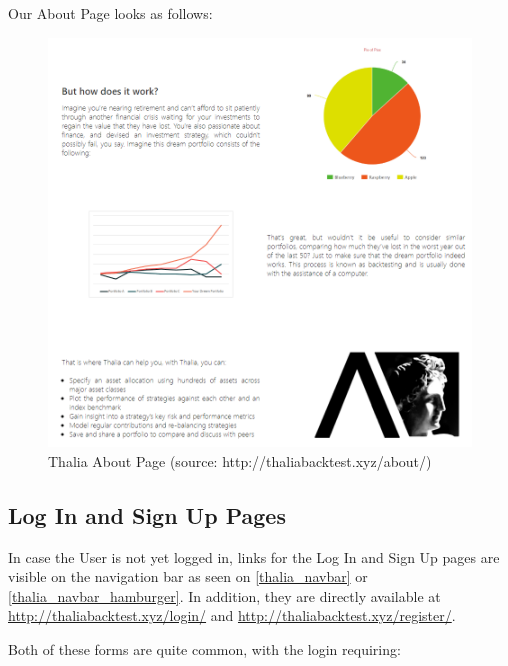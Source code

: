 \documentclass[main.tex]{subfiles}
\begin{document}
Our About Page looks as follows:



\begin{figure}[H]

   \centering

   \includegraphics[width=\textwidth]{08Appendices/081User/081Pictures/about.png}

   \caption{Thalia About Page (source: http://thaliabacktest.xyz/about/)}

   \label{thalia_about}

\end{figure}



\subsection{Log In and Sign Up Pages}

In case the User is not yet logged in, links for the Log In and Sign Up pages are visible on the navigation bar as seen on \figurename{\ref{thalia_navbar}} or \figurename{\ref{thalia_navbar_hamburger}}. In addition, they are directly available at \url{http://thaliabacktest.xyz/login/} and \url{http://thaliabacktest.xyz/register/}.

Both of these forms are quite common, with the login requiring:
\end{document}
